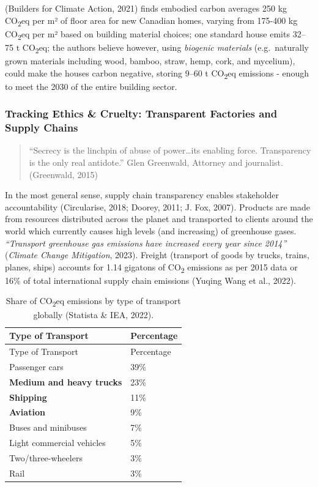 \documentclass[
  12pt,
  letterpaper,
  DIV=11,
  numbers=noendperiod]{scrartcl}
\begin{document}
(Builders for Climate Action, 2021) finds embodied carbon averages 250
kg CO\textsubscript{2}eq per m² of floor area for new Canadian homes,
varying from 175-400 kg CO\textsubscript{2}eq per m² based on building
material choices; one standard house emits 32--75 t
CO\textsubscript{2}eq; the authors believe however, using \emph{biogenic
materials} (e.g.~naturally grown materials including wood, bamboo,
straw, hemp, cork, and mycelium), could make the houses carbon negative,
storing 9--60 t CO\textsubscript{2}eq emissions - enough to meet the
2030 of the entire building sector.

\subsubsection{Tracking Ethics \& Cruelty: Transparent Factories and
Supply
Chains}\label{tracking-ethics-cruelty-transparent-factories-and-supply-chains}

\begin{quote}
``Secrecy is the linchpin of abuse of power\ldots its enabling force.
Transparency is the only real antidote.'' Glen Greenwald, Attorney and
journalist. (Greenwald, 2015)
\end{quote}

In the most general sense, supply chain transparency enables stakeholder
accountability (Circularise, 2018; Doorey, 2011; J. Fox, 2007). Products
are made from resources distributed across the planet and transported to
clients around the world which currently causes high levels (and
increasing) of greenhouse gases. \emph{``Transport greenhouse gas
emissions have increased every year since 2014''} (\emph{Climate Change
Mitigation}, 2023). Freight (transport of goods by trucks, trains,
planes, ships) accounts for 1.14 gigatons of CO\textsubscript{2}
emissions as per 2015 data or 16\% of total international supply chain
emissions (Yuqing Wang et al., 2022).

\def\pandoctableshortcapt{Share of CO\textsubscript{2}eq Emissions by
Type of Transport Globally}

\begin{longtable}[]{@{}ll@{}}
\caption[Share of CO~2~eq Emissions by Type of Transport Globally]{Share
of CO\textsubscript{2}eq emissions by type of transport globally
(Statista \& IEA, 2022).}\tabularnewline
\toprule\noalign{}
Type of Transport & Percentage \\
\midrule\noalign{}
\endfirsthead
\toprule\noalign{}
Type of Transport & Percentage \\
\midrule\noalign{}
\endhead
\bottomrule\noalign{}
\endlastfoot
Passenger cars & 39\% \\
\textbf{Medium and heavy trucks} & 23\% \\
\textbf{Shipping} & 11\% \\
\textbf{Aviation} & 9\% \\
Buses and minibuses & 7\% \\
Light commercial vehicles & 5\% \\
Two/three-wheelers & 3\% \\
Rail & 3\% \\
\end{longtable}
\end{document}
